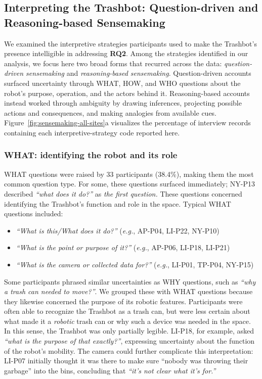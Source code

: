 \subsection{Interpreting the Trashbot: Question-driven and Reasoning-based Sensemaking} 
\label{sec:process}

We examined the interpretive strategies participants used to make the Trashbot’s presence intelligible in addressing \textbf{RQ2}. Among the strategies identified in our analysis, we focus here two broad forms that recurred across the data: \textit{question-driven sensemaking} and \textit{reasoning-based sensemaking}. Question-driven accounts surfaced uncertainty through WHAT, HOW, and WHO questions about the robot’s purpose, operation, and the actors behind it. Reasoning-based accounts instead worked through ambiguity by drawing inferences, projecting possible actions and consequences, and making analogies from available cues. Figure~\ref{fig:sensemaking-all-sites}a visualizes the percentage of interview records containing each interpretive-strategy code reported here.

\subsubsection{WHAT: identifying the robot and its role}
WHAT questions were raised by 33 participants (38.4\%), making them the most common question type. For some, these questions surfaced immediately; NY-P13 described \emph{``what does it do?''} as \emph{the first question.} These questions concerned identifying the Trashbot's function and role in the space. Typical WHAT questions included:

\begin{itemize}
    \item \emph{``What is this/What does it do?''} (\textit{e.g.}, AP-P04, LI-P22, NY-P10)
    \item \emph{``What is the point or purpose of it?''} (\textit{e.g.}, AP-P06, LI-P18, LI-P21)
    \item \emph{``What is the camera or collected data for?''} (\textit{e.g.}, LI-P01, TP-P04, NY-P15)
\end{itemize}

Some participants phrased similar uncertainties as WHY questions, such as \emph{``why a trash can needed to move?''}. We grouped these with WHAT questions because they likewise concerned the purpose of its robotic features. Participants were often able to recognize the Trashbot as a trash can, but were less certain about what made it a \emph{robotic} trash can or why such a device was needed in the space. In this sense, the Trashbot was only partially legible. LI-P18, for example, asked \emph{``what is the purpose of that exactly?''}, expressing uncertainty about the function of the robot's mobility. The camera could further complicate this interpretation: LI-P07 initially thought it was there to make sure ``nobody was throwing their garbage'' into the bins, concluding that \emph{``it's not clear what it's for.''} 


